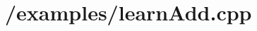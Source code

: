 \section{/examples/learnAdd.cpp}


\begin{DocInclude}\begin{verbatim}\end{verbatim}
\end{DocInclude}
 